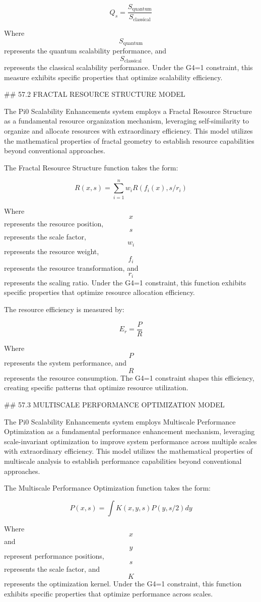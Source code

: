 $$ Q_s = \frac{S_{\text{quantum}}}{S_{\text{classical}}} $$

Where $$ S_{\text{quantum}} $$ represents the quantum scalability performance, and $$ S_{\text{classical}} $$ represents the classical scalability performance. Under the G4=1 constraint, this measure exhibits specific properties that optimize scalability efficiency.

## 57.2 FRACTAL RESOURCE STRUCTURE MODEL

The Pi0 Scalability Enhancements system employs a Fractal Resource Structure as a fundamental resource organization mechanism, leveraging self-similarity to organize and allocate resources with extraordinary efficiency. This model utilizes the mathematical properties of fractal geometry to establish resource capabilities beyond conventional approaches.

The Fractal Resource Structure function takes the form:

$$ R(x, s) = \sum_{i=1}^{n} w_i R(f_i(x), s/r_i) $$

Where $$ x $$ represents the resource position, $$ s $$ represents the scale factor, $$ w_i $$ represents the resource weight, $$ f_i $$ represents the resource transformation, and $$ r_i $$ represents the scaling ratio. Under the G4=1 constraint, this function exhibits specific properties that optimize resource allocation efficiency.

The resource efficiency is measured by:

$$ E_r = \frac{P}{R} $$

Where $$ P $$ represents the system performance, and $$ R $$ represents the resource consumption. The G4=1 constraint shapes this efficiency, creating specific patterns that optimize resource utilization.

## 57.3 MULTISCALE PERFORMANCE OPTIMIZATION MODEL

The Pi0 Scalability Enhancements system employs Multiscale Performance Optimization as a fundamental performance enhancement mechanism, leveraging scale-invariant optimization to improve system performance across multiple scales with extraordinary efficiency. This model utilizes the mathematical properties of multiscale analysis to establish performance capabilities beyond conventional approaches.

The Multiscale Performance Optimization function takes the form:

$$ P(x, s) = \int K(x, y, s) P(y, s/2) dy $$

Where $$ x $$ and $$ y $$ represent performance positions, $$ s $$ represents the scale factor, and $$ K $$ represents the optimization kernel. Under the G4=1 constraint, this function exhibits specific properties that optimize performance across scales.

